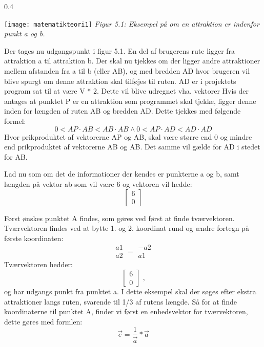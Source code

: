 \begin{wrapfigure}{}{0.4\textwidth}
	\vspace{-10pt}
	\begin{center}
		\texttt{[image: matematikteori1]} \newline
		\textit{Figur 5.1: Eksempel på om en attraktion er indenfor punkt a og b.}\newline
	\end{center}
	\vspace{-20pt}
\end{wrapfigure}

Der tages nu udgangspunkt i figur 5.1. En del af brugerens rute ligger fra attraktion a til attraktion b. Der skal nu tjekkes om der ligger andre attraktioner mellem afstanden fra a til b (eller AB), og med bredden AD hvor brugeren vil blive spurgt om denne attraktion skal tilføjes til ruten. AD er i projektets program sat til at være V * 2. Dette vil blive udregnet vha. vektorer 
Hvis der antages at punktet P er en attraktion som programmet skal tjekke, ligger denne inden for længden af ruten AB og bredden AD. Dette tjekkes med følgende formel:
\[0 < AP \cdot AB < AB \cdot AB \wedge 0 < AP \cdot AD < AD \cdot AD \]
Hvor prikproduktet af vektorerne AP og AB, skal være større end 0 og mindre end prikproduktet af vektorerne AB og AB. Det samme vil gælde for AD i stedet for AB.

Lad nu som om det de informationer der kendes er punkterne a og b, samt længden på vektor ab som vil være 6 og vektoren vil hedde:
\[ \begin{bmatrix} 6 \\ 0 \end{bmatrix} \]

Først ønskes punktet A findes, som gøres ved først at finde tværvektoren. Tværvektoren findes ved at bytte 1. og 2. koordinat rund og ændre fortegn på første koordinaten:
\[ \begin{matrix} a1 \\ a2 \end{matrix} = \begin{matrix} -a2 \\ a1 \end{matrix} \]
Tværvektoren hedder: 
\[ \begin{bmatrix} 6 \\ 0 \end{bmatrix} \text{ ,} \]
og har udgangs punkt fra punktet a. \newline
I dette eksempel skal der søges efter ekstra attraktioner langs ruten, svarende til 1/3 af rutens længde. Så for at finde koordinaterne til punktet A, finder vi først en enhedsvektor for tværvektoren, dette gøres med formlen:
\[ \overrightarrow{e} = \frac{1}{\overrightarrow{a}}*\overrightarrow{a} \] 

